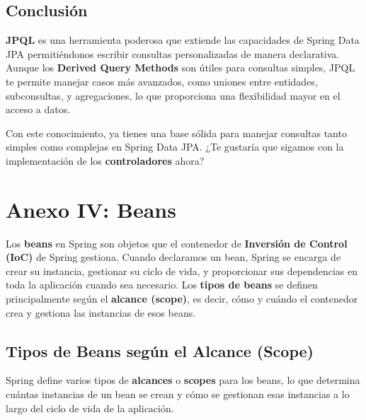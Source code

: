 \documentclass[11pt]{article}
\begin{document}
\subsection{Conclusión}
\label{sec:org4def051}
\textbf{\textbf{JPQL}} es una herramienta poderosa que extiende las capacidades de Spring Data JPA permitiéndonos escribir consultas personalizadas de manera declarativa. Aunque los \textbf{\textbf{Derived Query Methods}} son útiles para consultas simples, JPQL te permite manejar casos más avanzados, como uniones entre entidades, subconsultas, y agregaciones, lo que proporciona una flexibilidad mayor en el acceso a datos.

Con este conocimiento, ya tienes una base sólida para manejar consultas tanto simples como complejas en Spring Data JPA. ¿Te gustaría que sigamos con la implementación de los \textbf{\textbf{controladores}} ahora?


\section{Anexo IV: Beans}
\label{sec:org7c71e22}

 Los \textbf{\textbf{beans}} en Spring son objetos que el contenedor de \textbf{\textbf{Inversión de Control (IoC)}} de Spring gestiona.
Cuando declaramos un bean, Spring se encarga de crear su instancia, gestionar su ciclo de vida, y proporcionar sus dependencias en toda la aplicación cuando sea necesario.
Los \textbf{\textbf{tipos de beans}} se definen principalmente según el \textbf{\textbf{alcance (scope)}}, es decir, cómo y cuándo el contenedor crea y gestiona las instancias de esos beans.

\subsection{Tipos de Beans según el Alcance (Scope)}
\label{sec:org417ad24}
Spring define varios tipos de \textbf{\textbf{alcances}} o \textbf{\textbf{scopes}} para los beans, lo que determina cuántas instancias de un bean se crean y cómo se gestionan esas instancias a lo largo del ciclo de vida de la aplicación.
\end{document}
